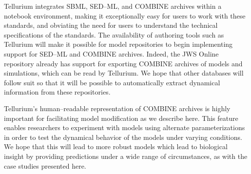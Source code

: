 \documentclass[10pt,letterpaper]{article}
\begin{document}
Tellurium integrates SBML, SED--ML, and COMBINE archives within a notebook environment, making it exceptionally easy for users to work with these standards, and obviating the need for users to understand the technical specifications of the standards. The availability of authoring tools such as Tellurium will make it possible for model repositories to begin implementing support for SED--ML and COMBINE archives. Indeed, the JWS Online repository \cite{olivier2004web} already has support for exporting COMBINE archives of models and simulations, which can be read by Tellurium. We hope that other databases will follow suit so that it will be possible to automatically extract dynamical information from these repositories.



Tellurium's human--readable representation of COMBINE archives is highly important for facilitating model modification as we describe here. This feature enables researchers to experiment with models using alternate parameterizations in order to test the dynamical behavior of the models under varying conditions. We hope that this will lead to more robust models which lead to biological insight by providing predictions under a wide range of circumstances, as with the case studies presented here.
\end{document}

